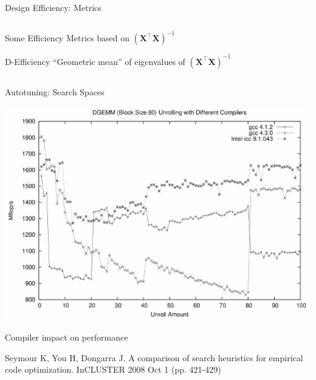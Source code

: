 \documentclass[10pt, compress, aspectratio=169, xcolor={table,usenames,dvipsnames}]{beamer}
\begin{document}
\begin{frame}[label={sec:org458d4d8}]{Design Efficiency: Metrics}
\begin{columns}
\begin{column}{0.5\columnwidth}
\begin{block}{Some Efficiency Metrics based on \(\left(\bm{X}^{\intercal}\bm{X}\right)^{-1}\)}
\begin{block}{D-Efficiency}
\vspace{-.3cm}
\colorbox{Accent!25}{``Geometric mean'' of eigenvalues of \(\left(\bm{X}^{\intercal}\bm{X}\right)^{-1}\)}
\end{block}
\end{block}
\end{column}
\end{columns}
\end{frame}
\begin{frame}[label={sec:org94390a1}]{Autotuning: Search Spaces}
\addtocounter{framenumber}{-1}
\begin{center}
\begin{center}
\includegraphics[width=.6\linewidth]{../../../img/seymour2008comparison_compilers.pdf}
\end{center}

\vspace{-.2cm}

\alert{Compiler impact} on performance

\scriptsize{Seymour K, You H, Dongarra J. A comparison of search heuristics for empirical code optimization. InCLUSTER 2008 Oct 1 (pp. 421-429)}
\end{center}
\end{frame}
\end{document}
